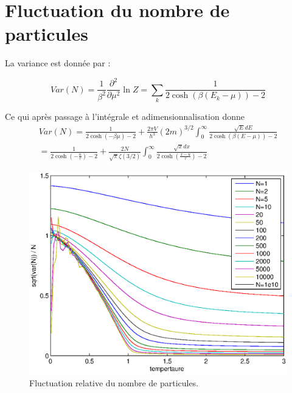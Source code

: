 \documentclass[a4paper,english]{article}
\begin{document}
\section{Fluctuation du nombre de particules}

La variance est donnée par :

$$Var(N) = \frac{1}{\beta^2} \frac{\partial^2}{\partial \mu^2} \ln Z = \sum_k \frac{1}{2 \cosh(\beta(E_k-\mu))-2}$$

Ce qui après passage à l'intégrale et adimensionnalisation donne 
\begin{gather}
Var(N) = \frac{1}{2\cosh(-\beta \mu)-2} + \frac{2\pi V}{h^3} (2m)^{3/2} \int_0^\infty \frac{\sqrt{E} dE}{2\cosh(\beta(E-\mu))-2} \\
= \frac{1}{2\cosh(-\frac{u}{\tau})-2} + \frac{2N}{\sqrt{\pi} \zeta(3/2)} \int_0^\infty \frac{\sqrt{x} dx}{2\cosh(\frac{x-u}{\tau})-2}
\end{gather}

\begin{figure}
	\centering
	\includegraphics{rel.eps}
	\caption{Fluctuation relative du nombre de particules.}
\end{figure}
\end{document}
